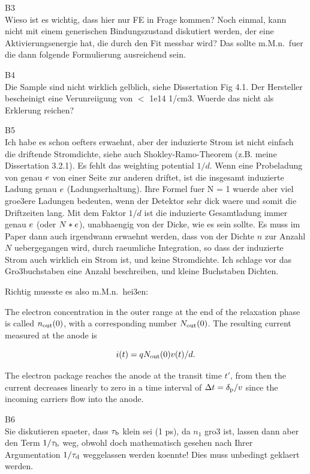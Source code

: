 B3\\
Wieso ist es wichtig, dass hier nur FE in Frage kommen? Noch einmal, kann nicht mit einem generischen Bindungszustand diskutiert werden, der eine Aktivierungsenergie hat, die durch den Fit messbar wird? 
Das sollte m.M.n.\ fuer die dann folgende Formulierung ausreichend sein. 

B4\\
Die Sample sind nicht wirklich gelblich, siehe Dissertation Fig 4.1. Der Hersteller bescheinigt eine Verunreiigung von $<$ 1e14 1/cm3. Wuerde das nicht als Erklerung reichen?

B5\\
Ich habe es schon oefters erwaehnt, aber der induzierte Strom ist nicht einfach die driftende Stromdichte, siehe auch Shokley-Ramo-Theorem (z.B. meine Dissertation 3.2.1). 
Es fehlt das weighting potential $1/d$. 
Wenn eine Probeladung von genau $\mathnormal{e}$ von einer Seite zur anderen driftet, ist die insgesamt induzierte Ladung genau $\mathnormal{e}$ (Ladungserhaltung). 
Ihre Formel fuer N = 1 wuerde aber viel groe3ere Ladungen bedeuten, wenn der Detektor sehr dick waere und somit die Driftzeiten lang. 
Mit dem Faktor $1/d$ ist die induzierte Gesamtladung immer genau $\mathnormal{e}$ (oder $N*\mathnormal{e}$), unabhaengig von der Dicke, wie es sein sollte. 
Es muss im Paper dann auch irgendwann erwaehnt werden, dass von der Dichte $n$ zur Anzahl $N$ uebergegangen wird, durch raeumliche Integration,
 so dass der induzierte Strom auch wirklich ein Strom ist, und keine Stromdichte.
Ich schlage vor das Gro3buchstaben eine Anzahl beschreiben, und kleine Buchstaben Dichten.

Richtig muesste es also m.M.n.\ hei3en:

The electron concentration in the outer range at the end of the relaxation phase is called $n_{\textrm{out}}(0)$, with a corresponding number $N_{\textrm{out}}(0)$.
The resulting current measured at the anode is

\begin{equation}
 i(t) = qN_{\textrm{out}}(0)v(t)/d. 
\end{equation}

\noindent
The electron package reaches the anode at the transit time $t'$, from then the current decreases linearly to zero in a time interval of  $\Delta t = \delta_{\textrm{p}}/v$  since the incoming carriers flow into the anode.   

B6\\
Sie diskutieren spaeter, dass $\tau_{\textrm{b}}$ klein sei (1 ps), da $n_1$ gro3 ist, lassen dann aber den Term $1/\tau_{\textrm{b}}$ weg, obwohl doch mathematisch gesehen nach Ihrer Argumentation $1/\tau_{\textrm{d}}$ weggelassen werden koennte!
Dies muss unbedingt geklaert werden. 

